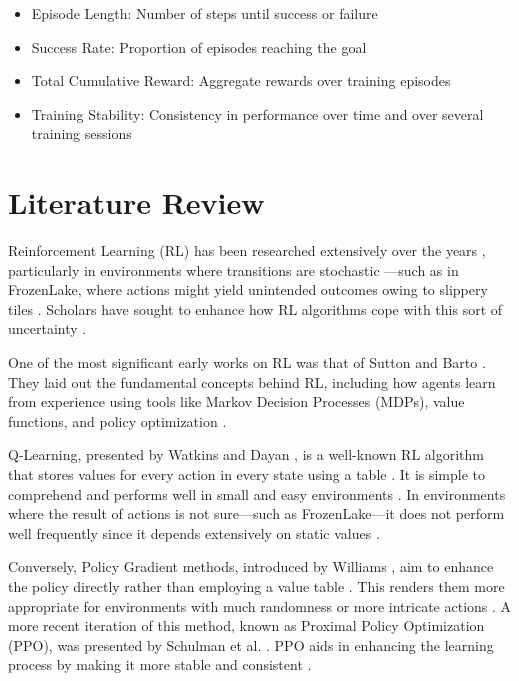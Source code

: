 \documentclass[conference]{IEEEtran}
\begin{document}
\begin{itemize}
\item Episode Length: Number of steps until success or failure \cite{Thomas2016}
\item Success Rate: Proportion of episodes reaching the goal \cite{Mnih2015}
\item Total Cumulative Reward: Aggregate rewards over training episodes \cite{SuttonBarto2018}
\item Training Stability: Consistency in performance over time and over several training sessions \cite{Henderson2018}
\end{itemize}

\section{Literature Review}
Reinforcement Learning (RL) has been researched extensively over the years \cite{SuttonBarto2018}, particularly in environments where transitions are stochastic \cite{Littman1996}—such as in FrozenLake, where actions might yield unintended outcomes owing to slippery tiles \cite{Brockman2016}. Scholars have sought to enhance how RL algorithms cope with this sort of uncertainty \cite{Ernst2005}.

One of the most significant early works on RL was that of Sutton and Barto \cite{SuttonBarto2018}. They laid out the fundamental concepts behind RL, including how agents learn from experience using tools like Markov Decision Processes (MDPs), value functions, and policy optimization \cite{SuttonBarto2018}.

Q-Learning, presented by Watkins and Dayan \cite{Watkins1992}, is a well-known RL algorithm that stores values for every action in every state using a table \cite{Melo2001}. It is simple to comprehend and performs well in small and easy environments \cite{Watkins1992}. In environments where the result of actions is not sure—such as FrozenLake—it does not perform well frequently since it depends extensively on static values \cite{Thomas2016}.

Conversely, Policy Gradient methods, introduced by Williams \cite{Williams1992}, aim to enhance the policy directly rather than employing a value table \cite{Sutton2000}. This renders them more appropriate for environments with much randomness or more intricate actions \cite{Kakade2002}. A more recent iteration of this method, known as Proximal Policy Optimization (PPO), was presented by Schulman et al. \cite{Schulman2015}. PPO aids in enhancing the learning process by making it more stable and consistent \cite{Schulman2015}.
\end{document}
